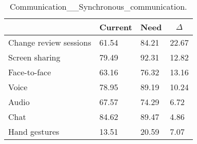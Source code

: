 
  \begin{table*}[]
  \centering
  \notsotiny
  \caption{ Communication__Synchronous_communication.}
\label{tab:communication__synchronous_communication}
\begin{tabular}{|l|l|l|l|}
  \hline
  \rowcolor[HTML]{C0C0C0}
    \multicolumn{1}{|c|}{Feature} & \multicolumn{1}{c|}{Current} & \multicolumn{1}{c|}{Need} & \multicolumn{1}{c|}{$\Delta$} \\ \hline
  Change review sessions & 61.54 & 84.21 & 22.67 \\ \hline 
Screen sharing & 79.49 & 92.31 & 12.82 \\ \hline 
Face-to-face & 63.16 & 76.32 & 13.16 \\ \hline 
Voice & 78.95 & 89.19 & 10.24 \\ \hline 
Audio & 67.57 & 74.29 & 6.72 \\ \hline 
Chat & 84.62 & 89.47 & 4.86 \\ \hline 
Hand gestures & 13.51 & 20.59 & 7.07 \\ \hline 
\end{tabular}%
  \end{table*}